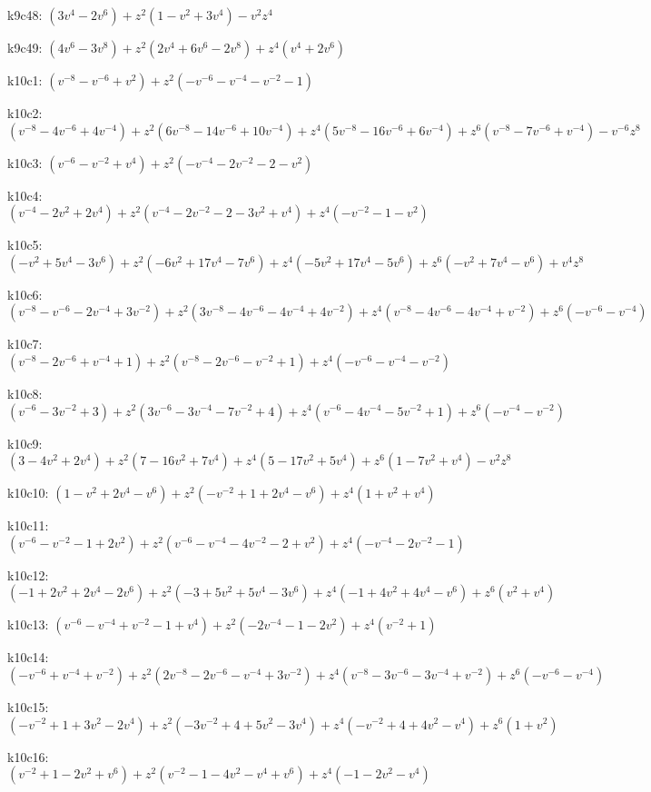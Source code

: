 k9c48: $ (3v^{4}-2v^{6})  +z^{2}(1-v^{2}+3v^{4})  -v^{2}z^{4} $ 

k9c49: $ (4v^{6}-3v^{8})  +z^{2}(2v^{4}+6v^{6}-2v^{8})  +z^{4}(v^{4}+2v^{6}) $ 

k10c1: $ (v^{-8}-v^{-6}+v^{2})  +z^{2}(-v^{-6}-v^{-4}-v^{-2}-1) $ 

k10c2: $ (v^{-8}-4v^{-6}+4v^{-4})  +z^{2}(6v^{-8}-14v^{-6}+10v^{-4})  +z^{4}(5v^{-8}-16v^{-6}+6v^{-4})  +z^{6}(v^{-8}-7v^{-6}+v^{-4})  -v^{-6}z^{8} $ 

k10c3: $ (v^{-6}-v^{-2}+v^{4})  +z^{2}(-v^{-4}-2v^{-2}-2-v^{2}) $ 

k10c4: $ (v^{-4}-2v^{2}+2v^{4})  +z^{2}(v^{-4}-2v^{-2}-2-3v^{2}+v^{4})  +z^{4}(-v^{-2}-1-v^{2}) $ 

k10c5: $ (-v^{2}+5v^{4}-3v^{6})  +z^{2}(-6v^{2}+17v^{4}-7v^{6})  +z^{4}(-5v^{2}+17v^{4}-5v^{6})  +z^{6}(-v^{2}+7v^{4}-v^{6})  +v^{4}z^{8} $ 

k10c6: $ (v^{-8}-v^{-6}-2v^{-4}+3v^{-2})  +z^{2}(3v^{-8}-4v^{-6}-4v^{-4}+4v^{-2})  +z^{4}(v^{-8}-4v^{-6}-4v^{-4}+v^{-2})  +z^{6}(-v^{-6}-v^{-4}) $ 

k10c7: $ (v^{-8}-2v^{-6}+v^{-4}+1)  +z^{2}(v^{-8}-2v^{-6}-v^{-2}+1)  +z^{4}(-v^{-6}-v^{-4}-v^{-2}) $ 

k10c8: $ (v^{-6}-3v^{-2}+3)  +z^{2}(3v^{-6}-3v^{-4}-7v^{-2}+4)  +z^{4}(v^{-6}-4v^{-4}-5v^{-2}+1)  +z^{6}(-v^{-4}-v^{-2}) $ 

k10c9: $ (3-4v^{2}+2v^{4})  +z^{2}(7-16v^{2}+7v^{4})  +z^{4}(5-17v^{2}+5v^{4})  +z^{6}(1-7v^{2}+v^{4})  -v^{2}z^{8} $ 

k10c10: $ (1-v^{2}+2v^{4}-v^{6})  +z^{2}(-v^{-2}+1+2v^{4}-v^{6})  +z^{4}(1+v^{2}+v^{4}) $ 

k10c11: $ (v^{-6}-v^{-2}-1+2v^{2})  +z^{2}(v^{-6}-v^{-4}-4v^{-2}-2+v^{2})  +z^{4}(-v^{-4}-2v^{-2}-1) $ 

k10c12: $ (-1+2v^{2}+2v^{4}-2v^{6})  +z^{2}(-3+5v^{2}+5v^{4}-3v^{6})  +z^{4}(-1+4v^{2}+4v^{4}-v^{6})  +z^{6}(v^{2}+v^{4}) $ 

k10c13: $ (v^{-6}-v^{-4}+v^{-2}-1+v^{4})  +z^{2}(-2v^{-4}-1-2v^{2})  +z^{4}(v^{-2}+1) $ 

k10c14: $ (-v^{-6}+v^{-4}+v^{-2})  +z^{2}(2v^{-8}-2v^{-6}-v^{-4}+3v^{-2})  +z^{4}(v^{-8}-3v^{-6}-3v^{-4}+v^{-2})  +z^{6}(-v^{-6}-v^{-4}) $ 

k10c15: $ (-v^{-2}+1+3v^{2}-2v^{4})  +z^{2}(-3v^{-2}+4+5v^{2}-3v^{4})  +z^{4}(-v^{-2}+4+4v^{2}-v^{4})  +z^{6}(1+v^{2}) $ 

k10c16: $ (v^{-2}+1-2v^{2}+v^{6})  +z^{2}(v^{-2}-1-4v^{2}-v^{4}+v^{6})  +z^{4}(-1-2v^{2}-v^{4}) $ 

